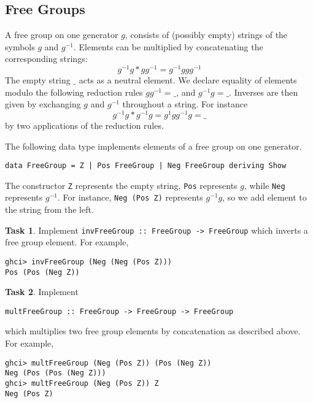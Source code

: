 \documentclass{article}[12pt]
\theoremstyle{definition}
\newtheorem{task}{Task}
\begin{document}
\subsection{Free Groups}
A free group on one generator $g$, consists of (possibly empty) strings of the symbols $g$ and $g^{-1}$. Elements can be multiplied by concatenating the corresponding strings: 
$$g^{-1}g * gg^{-1} = g^{-1}ggg^{-1}$$
The empty string $\_$ acts as a neutral element. 
We declare equality of elements modulo the following reduction rules 
$gg^{-1} = \_$, and $g^{-1}g = \_$.
Inverses are then given by exchanging $g$ and $g^{-1}$ throughout a string. For instance 
$$g^{-1}g * g^{-1}g = g^{1}g g^{-1}g = \_$$
by two applications of the reduction rules.

The following data type implements elements of a free group on one generator. 
\begin{verbatim}
data FreeGroup = Z | Pos FreeGroup | Neg FreeGroup deriving Show
\end{verbatim}
The constructor \verb|Z| represents the empty string, \verb|Pos| represents $g$, while \verb|Neg| represents $g^{-1}$. For instance, \verb|Neg (Pos Z)| represents $g^{-1}g$, so we add element to the string from the left.

\begin{task}
    Implement \verb|invFreeGroup :: FreeGroup -> FreeGroup| which inverts a free group element.
    For example,
    \begin{verbatim}
ghci> invFreeGroup (Neg (Neg (Pos Z)))
Pos (Pos (Neg Z))\end{verbatim}
\end{task}

\begin{task}
    Implement 
    \begin{verbatim}multFreeGroup :: FreeGroup -> FreeGroup -> FreeGroup \end{verbatim} 
    which multiplies two free group elements by concatenation as described above.
    For example,
    \begin{verbatim}
ghci> multFreeGroup (Neg (Pos Z)) (Pos (Neg Z))
Neg (Pos (Pos (Neg Z)))
ghci> multFreeGroup (Neg (Pos Z)) Z
Neg (Pos Z)\end{verbatim}
\end{task}
\end{document}
